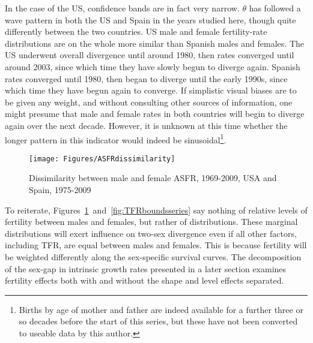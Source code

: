 In the case of the US, confidence bands are in fact very narrow. $\theta$ has followed
a wave pattern in both the US and Spain in the years studied here, though 
quite differently between the two countries. US male and female fertility-rate
distributions are on the whole more similar than Spanish males and females. The
US underwent overall divergence until around 1980, then rates converged until
around 2003, since which time they have slowly begun to diverge again. Spanish
rates converged until 1980, then began to diverge until the early 1990s, since
which time they have begun again to converge. If simplistic visual biases are to
be given any weight, and without consulting other sources of information, one
might presume that male and female rates in both countries will begin to diverge
again over the next decade. However, it is unknown at this time whether the
longer pattern in this indicator would indeed be sinusoidal\footnote{Births by
age of mother and father are indeed available for a further three or so decades
before the start of this series, but these have not been converted to
useable data by this author.}.

\begin{figure}[ht!]
        \centering  
          \caption{Dissimilarity between male and female ASFR, 1969-2009, USA
          and Spain, 1975-2009}
           \texttt{[image: Figures/ASFRdissimilarity]}
          \label{fig:ASFRdissimilarity}
\end{figure}

To reiterate, Figures~\ref{fig:ASFRdissimilarity}~and~\ref{fig:TFRboundsseries}
say nothing of relative levels of fertility between males and females, but
rather of distributions. These marginal distributions will exert influence on
two-sex divergence even if all other factors, including TFR, are equal between
males and females. This is because fertility will be weighted differently along
the sex-specific survival curves. The decomposition of the sex-gap in
intrinsic growth rates presented in a later section examines fertility
effects both with and without the shape and level effects separated.

 \FloatBarrier